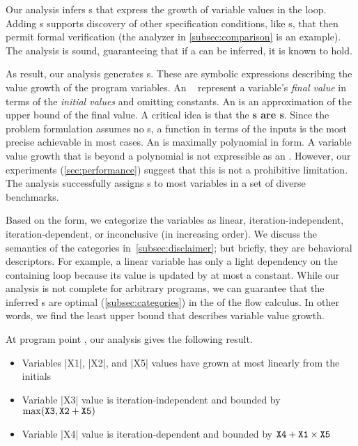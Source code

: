 Our analysis infers s that express the {growth of variable
values} in the loop. Adding s supports discovery of other
specification conditions, like s, that then permit formal
verification (the  analyzer in \autoref{subsec:comparison} is an
example). The analysis is sound, guaranteeing that if a
 can be inferred, it is known to hold.

As result, our analysis generates {s}. These are symbolic
expressions describing the value growth of the program variables. An
\emph{}~\cite{jones2009} represent a variable's \emph{final
value} in terms of the \emph{initial values} and omitting constants. An
 is an approximation of the {upper bound} of the final value. A
critical idea is that the \textbf{s are s}.
Since the problem formulation assumes no s, a function in
terms of the inputs is the most precise achievable  in most
cases. An  is maximally polynomial in form. A variable value
growth that is beyond a polynomial is not expressible as an .
However, our experiments (\autoref{sec:performance}) suggest that this is not a
prohibitive limitation. The analysis successfully assigns s
to most variables in a set of diverse benchmarks.

Based on the  form, we categorize the variables as
linear,
iteration-independent,
iteration-dependent, or inconclusive (in
increasing order). We discuss the semantics of the categories
in~\autoref{subsec:disclaimer}; but briefly, they are behavioral descriptors.
For example, a linear variable has only a light dependency on the containing
loop because its value is updated by at most a constant. While our analysis is
not complete for arbitrary programs, we can guarantee that the inferred
s are {optimal}
(\autoref{subsec:categories}) \wrt in the  of the flow
calculus. In other words, we find the least upper bound that describes variable
value growth.

At program point \qtext, our analysis gives the following result.
\begin{itemize}
\item Variables \pr|X1|, \pr|X2|, and \pr|X5| values have grown at most
linearly from the initials
\item Variable  \pr|X3| value is
iteration-independent and bounded by
\(\max(\prm{X3},\prm{X2}+\prm{X5})\)
\item Variable  \pr|X4| value is
iteration-dependent and bounded by
\(\prm{X4}+\prm{X1}\times\prm{X5}\)
\end{itemize}

